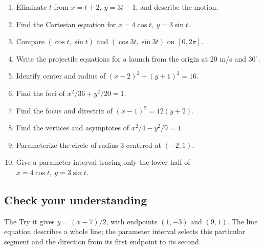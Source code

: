 \begin{enumerate}
\def\labelenumi{\arabic{enumi}.}
\tightlist
\item
  Eliminate \(t\) from \(x=t+2,\ y=3t-1\), and describe the motion.
\item
  Find the Cartesian equation for \(x=4\cos t,\ y=3\sin t\).
\item
  Compare \((\cos t,\sin t)\) and \((\cos3t,\sin3t)\) on \([0,2\pi]\).
\item
  Write the projectile equations for a launch from the origin at 20 m/s and \(30^\circ\).
\item
  Identify center and radius of \((x-2)^2+(y+1)^2=16\).
\item
  Find the foci of \(x^2/36+y^2/20=1\).
\item
  Find the focus and directrix of \((x-1)^2=12(y+2)\).
\item
  Find the vertices and asymptotes of \(x^2/4-y^2/9=1\).
\item
  Parameterize the circle of radius 3 centered at \((-2,1)\).
\item
  Give a parameter interval tracing only the lower half of \(x=4\cos t,\ y=3\sin t\).
\end{enumerate}

\hypertarget{m8-check-your-understanding}{%
\subsection{Check your understanding}\label{m8-check-your-understanding}}

The Try it gives \(y=(x-7)/2\), with endpoints \((1,-3)\) and \((9,1)\). The line equation describes a whole line; the parameter interval selects this particular segment and the direction from its first endpoint to its second.

\clearpage
